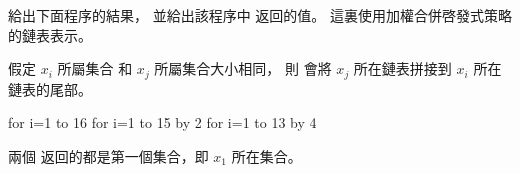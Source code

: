 \startEXERCISE[exercise:21.2-2]
給出下面程序的結果，
並給出該程序中  返回的值。
這裏使用加權合併啓發式策略的鏈表表示。

假定 $x_i$ 所屬集合 和 $x_j$ 所屬集合大小相同，
則  會將 $x_j$ 所在鏈表拼接到 $x_i$ 所在鏈表的尾部。
\stopEXERCISE

\startCLRSCODE
for i=1 to 16
for i=1 to 15 by 2
for i=1 to 13 by 4
\stopCLRSCODE

\startANSWER
兩個  返回的都是第一個集合，即 $x_1$ 所在集合。

{
\txx
{}
}
\stopANSWER